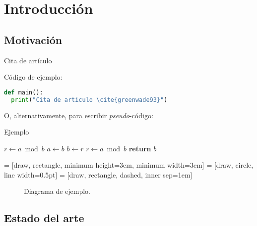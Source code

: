 \section{Introducción}

\subsection{Motivación}

Cita de artículo \cite{greenwade93}

Código de ejemplo:
\begin{lstlisting}[language=Python]
def main():
  print("Cita de articulo \cite{greenwade93}")
\end{lstlisting}

O, alternativamente, para escribir {\it pseudo}-código:
\begin{algorithm}[H]
  \caption{Ejemplo}\label{euclid}
  \begin{algorithmic}[1]
     
        \State $r\gets a \bmod b$
         
            \State $a \gets b$
            \State $b \gets r$
            \State $r \gets a \bmod b$
        \EndWhile\label{euclidendwhile}
        \State \textbf{return} $b$
    \EndProcedure
  \end{algorithmic}
\end{algorithm}

 = [draw, rectangle, minimum height=3em, minimum width=3em]
 = [draw, circle, line width=0.5pt]
 = [draw, rectangle, dashed, inner sep=1em]
\begin{figure*}[h]
  \centering
  \caption{Diagrama de ejemplo.}
\end{figure*}

\subsection{Estado del arte}

